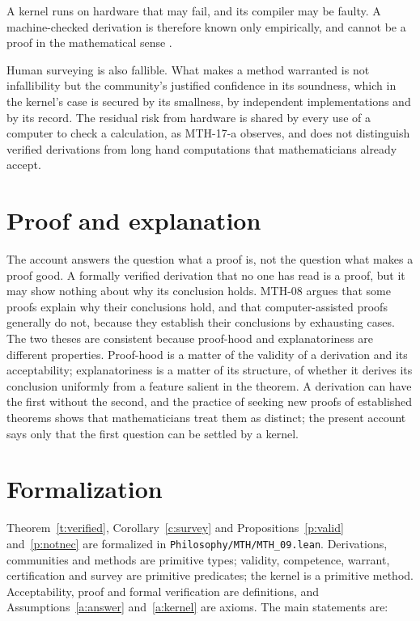 \documentclass{situationist-preprint}
\begin{document}
\begin{objection}
A kernel runs on hardware that may fail, and its compiler may be faulty. A machine-checked derivation is therefore known only empirically, and cannot be a proof in the mathematical sense \citep{Tymoczko1979}.
\end{objection}

\begin{reply}
Human surveying is also fallible. What makes a method warranted is not infallibility but the community's justified confidence in its soundness, which in the kernel's case is secured by its smallness, by independent implementations and by its record. The residual risk from hardware is shared by every use of a computer to check a calculation, as MTH-17-a observes, and does not distinguish verified derivations from long hand computations that mathematicians already accept.
\end{reply}

\section{Proof and explanation}

The account answers the question what a proof is, not the question what makes a proof good. A formally verified derivation that no one has read is a proof, but it may show nothing about why its conclusion holds. MTH-08 argues that some proofs explain why their conclusions hold, and that computer-assisted proofs generally do not, because they establish their conclusions by exhausting cases. The two theses are consistent because proof-hood and explanatoriness are different properties. Proof-hood is a matter of the validity of a derivation and its acceptability; explanatoriness is a matter of its structure, of whether it derives its conclusion uniformly from a feature salient in the theorem. A derivation can have the first without the second, and the practice of seeking new proofs of established theorems shows that mathematicians treat them as distinct; the present account says only that the first question can be settled by a kernel.

\section{Formalization}

Theorem~\ref{t:verified}, Corollary~\ref{c:survey} and Propositions~\ref{p:valid} and~\ref{p:notnec} are formalized in \nolinkurl{Philosophy/MTH/MTH_09.lean}. Derivations, communities and methods are primitive types; validity, competence, warrant, certification and survey are primitive predicates; the kernel is a primitive method. Acceptability, proof and formal verification are definitions, and Assumptions~\ref{a:answer} and~\ref{a:kernel} are axioms. The main statements are:
\end{document}
